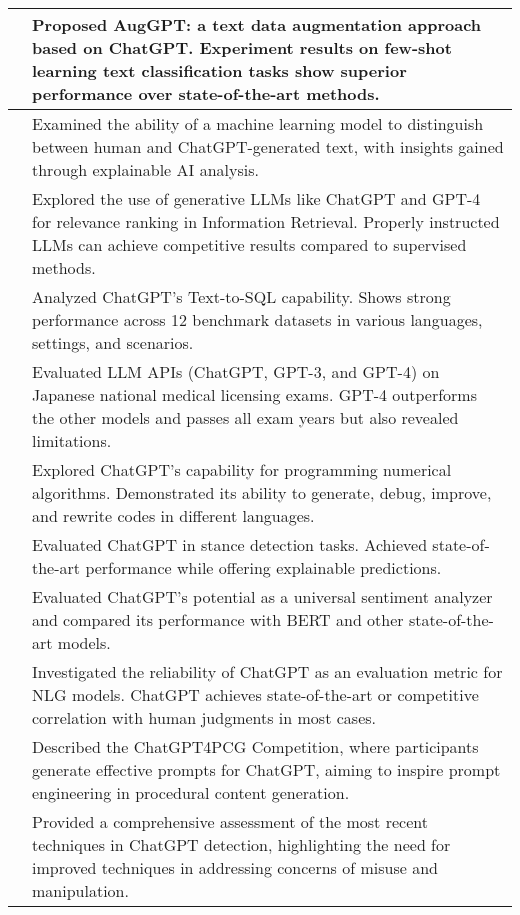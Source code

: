 \documentclass[11pt]{article}
\begin{document}
\begin{table*}
{\begin{tabular}{ll}
    \midrule
    \citet{dai2023auggpt} & Proposed AugGPT: a text data augmentation approach based on ChatGPT. Experiment results on few-shot learning text classification tasks show  superior performance over state-of-the-art methods.\\
    \midrule
    \citet{mitrović2023chatgpt} & Examined the ability of a machine learning model to distinguish between human and ChatGPT-generated text, with insights gained through explainable AI analysis.\\
    \midrule
    \citet{sun2023chatgpt} & Explored the use of generative LLMs like ChatGPT and GPT-4 for relevance ranking in Information Retrieval. Properly instructed LLMs can achieve competitive results compared to supervised methods.\\
    \midrule
    \citet{liu2023comprehensive} & Analyzed  ChatGPT's Text-to-SQL capability. Shows strong performance across 12 benchmark datasets in various languages, settings, and scenarios.\\
    \midrule
    \citet{kasai2023evaluating} & Evaluated LLM APIs (ChatGPT, GPT-3, and GPT-4) on Japanese national medical licensing exams. GPT-4 outperforms the other models and passes all exam years but also revealed limitations.\\
    \midrule
    \citet{kashefi2023chatgpt} & Explored ChatGPT's capability for programming numerical algorithms. Demonstrated its ability to generate, debug, improve, and rewrite codes in different languages.\\
    \midrule
    \citet{zhang2023stance} &  Evaluated ChatGPT  in stance detection tasks. Achieved state-of-the-art performance while offering explainable predictions.\\
    \midrule
    \citet{wang2023chatgpt} &  Evaluated ChatGPT's potential as a universal sentiment analyzer and compared its performance with BERT and other state-of-the-art models.\\
    \midrule
    \citet{zwang2023chatgpt} &  Investigated the reliability of ChatGPT as an evaluation metric for NLG models. ChatGPT achieves state-of-the-art or competitive correlation with human judgments in most cases.\\
    \midrule
    \citet{taveekitworachai2023chatgpt4pcg} &  Described the ChatGPT4PCG Competition, where participants generate effective prompts for ChatGPT, aiming to inspire prompt engineering in procedural content generation.\\
    \midrule
    \citet{pegoraro2023chatgpt} &  Provided a comprehensive assessment of the most recent techniques in ChatGPT detection, highlighting the need for improved techniques in addressing concerns of misuse and manipulation.\\

\end{tabular}}
\end{table*}
\end{document}
